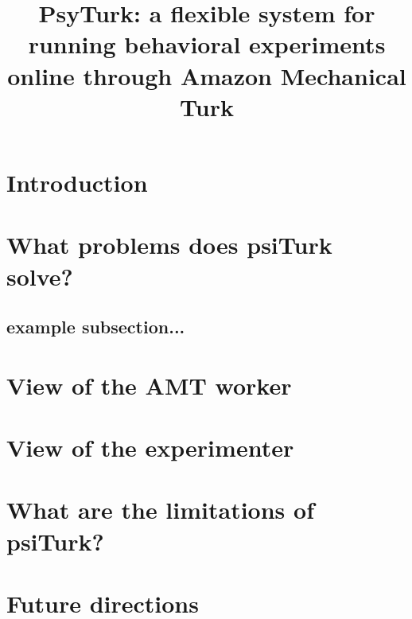 \documentclass[jou,apacite]{apa6}
\title{PsyTurk: a flexible system for running behavioral experiments online through Amazon Mechanical Turk}
\begin{document}
\maketitle
\section{Introduction}

\section{What problems does psiTurk solve?}
\subsection{example subsection...}

\section{View of the AMT worker}

\section{View of the experimenter}

\section{What are the limitations of psiTurk?}

\section{Future directions}


\end{document}
